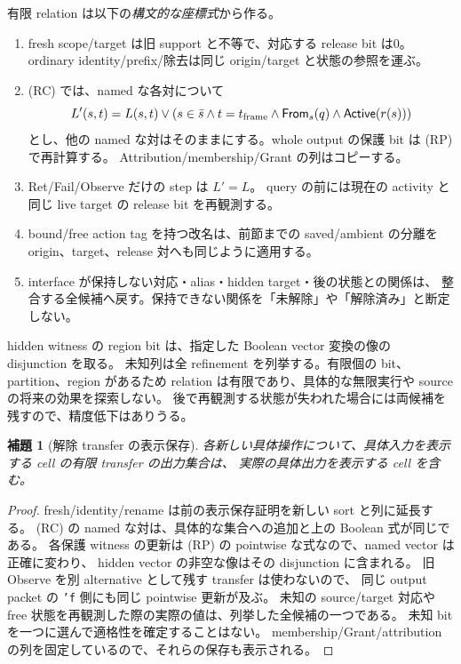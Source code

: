 \documentclass[11pt,a4paper]{article}
\newtheorem{lemma}[definition]{補題}
\begin{document}
有限 relation は以下の\emph{構文的な座標式}から作る。
\begin{enumerate}
\item fresh scope/target は旧 support と不等で、対応する release bit は0。
ordinary identity/prefix/除去は同じ origin/target と状態の参照を運ぶ。
\item (RC) では、named な各対について
\[
 L'(s,t)=L(s,t)\lor
   (s\in\bar s\land t=t_{\rm frame}\land\mathsf{From}_s(q)
                     \land\mathsf{Active}(r(s)))
\]
とし、他の named な対はそのままにする。whole output の保護 bit は (RP) で再計算する。
Attribution/membership/Grant の列はコピーする。
\item Ret/Fail/Observe だけの step は \(L'=L\)。
query の前には現在の activity と同じ live target の release bit を再観測する。
\item bound/free action tag を持つ改名は、前節までの saved/ambient の分離を
origin、target、release 対へも同じように適用する。
\item interface が保持しない対応・alias・hidden target・後の状態との関係は、
整合する全候補へ戻す。保持できない関係を「未解除」や「解除済み」と断定しない。
\end{enumerate}
hidden witness の region bit は、指定した Boolean vector 変換の像の disjunction を取る。
未知列は全 refinement を列挙する。有限個の bit、partition、region があるため
relation は有限であり、具体的な無限実行や source の将来の効果を探索しない。
後で再観測する状態が失われた場合には両候補を残すので、精度低下はありうる。

\begin{lemma}[解除 transfer の表示保存]
\label{lem:release-sim}
各新しい具体操作について、具体入力を表示する cell の有限 transfer の出力集合は、
実際の具体出力を表示する cell を含む。
\end{lemma}
\begin{proof}
fresh/identity/rename は前の表示保存証明を新しい sort と列に延長する。
(RC) の named な対は、具体的な集合への追加と上の Boolean 式が同じである。
各保護 witness の更新は (RP) の pointwise な式なので、named vector は正確に変わり、
hidden vector の非空な像はその disjunction に含まれる。
旧 Observe を別 alternative として残す transfer は使わないので、
同じ output packet の \texttt{'f} 側にも同じ pointwise 更新が及ぶ。
未知の source/target 対応や free 状態を再観測した際の実際の値は、列挙した全候補の一つである。
未知 bit を一つに選んで適格性を確定することはない。
membership/Grant/attribution の列を固定しているので、それらの保存も表示される。
\end{proof}
\end{document}
